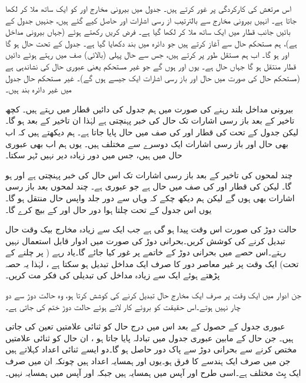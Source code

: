 اس مرتعش کی کارکردگی پر غور کرتے ہیں۔ جدول  میں بیرونی مخارج  اور  کو ایک  ساتھ ملا کر  لکھا جاتا ہے۔ انہیں بیرونی مخارج سے بالترتیب  از رسی  اشارات   اور  حاصل کیے  گئے  ہیں، جنہیں جدول کے بائیں جانب قطار میں ایک ساتھ ملا کر  لکھا گیا ہے۔  فرض کریں  رکھتے ہوئے (جہاں  بیرونی مداخل ہے)،  ہم مستحکم حال  سے آغاز کرتے ہیں جو دائرہ میں بند دکھایا گیا ہے۔ جدول کے تحت  حال  ہو گا اور   ہو گا۔ اب ہم  مستقل طور پر  کرتے ہیں، جس سے حال پہلی  (بالائی) صف  میں رہتے ہوئے دائیں قطار منتقل ہو گا جہاں حال  ہے۔ یوں  اور  ہوں گے جو غیر مستحکم یعنی عبوری حال کی نشاندہی ہے (مستحکم حال کی صورت میں حال اور باز رسی اشارات ایک جیسے ہوں گے)۔  غیر  مستحکم حال  جدول میں غیر  دائرہ بند ہیں۔

بیرونی مداخل بلند رہنے کی صورت میں ہم جدول کی  دائیں قطار میں رہتے ہیں۔    کچھ تاخیر کے بعد باز رسی اشارات تک حال  کی خبر پہنچتی ہے لہٰذا  ان تاخیر کے بعد  ہو گا۔ لیکن جدول کے تحت  کی قطار اور  کی صف میں  حال  پایا جاتا ہے۔ ہم دیکھتے ہیں کہ اب بھی  حال  اور باز رسی اشارات  ایک دوسرے سے مختلف ہیں۔ یوں ہم اب بھی عبوری حال میں ہیں، جس میں دور زیادہ دیر   نہیں ٹہر سکتا۔ 

چند لمحوں کی تاخیر کے بعد باز رسی اشارات   تک اس حال کی خبر پہنچتی ہے اور  ہو گا۔ لیکن  کی  قطار اور  کی صف میں حال  ہے جو عبوری ہے۔  چند لمحوں بعد باز رسی اشارات بھی  ہوں گے لیکن ہم دیکھ چکے کہ وہاں سے دور جلد واپس حال   منتقل ہو گا۔ یوں  اس جدول کے تحت چلتا ہوا دور حال  اور  کے بیچ    کرے  گا۔ 

حالت دوڑ کی صورت اس وقت پیدا ہو گی ہے جب ایک سے زیادہ مخارج بیک وقت حال تبدیل کرنے کی کوشش کریں۔بحرانی دوڑ کی صورت میں ادوار قابل استعمال نہیں رہتے۔اس حصے میں بحرانی دوڑ کے خاتمے پر غور کیا جائے گا۔یاد رہے ( پر چلنے کے تحت) ایک وقت پر غیر معاصر دور کا صرف ایک مداخل تبدیل ہو سکتا ہے ، لہٰذا یہ حصہ پڑھتے ہوئے ایک سے زیادہ مداخل کی تبدیلی کی فکر مت کریں۔

جن ادوار میں ایک وقت پر صرف ایک مخارج حال تبدیل کرنے کی کوشش کرتا ہو، وہ حالت دوڑ سے دو چار نہیں ہوتے۔اس حقیقت کو بروئے کار لاتے ہوئے حالت دوڑ ختم کی جاتی ہے۔

عبوری جدول کے حصول کے بعد اس میں درج حال کو ثنائی علامتیں تعین کی جاتی ہیں۔  جن  حال کے مابین عبوری جدول میں تبادلہ پایا جاتا ہو ،  ان حال کو  ثنائی علامتیں مختص کرنے سے بحرانی دوڑ سے پاک دور حاصل ہو گا۔دو ایسے ثنائی اعداد  کہلاتے ہیں جن میں صرف ایک ہندسے کا فرق ہو۔یوں  اور  ہمسایہ اعداد ہیں چونکہ ان میں صرف ایک بِٹ مختلف ہے۔اسی طرح  اور  آپس میں ہمسایہ ہیں جبکہ  اور  آپس میں ہمسایہ نہیں۔

